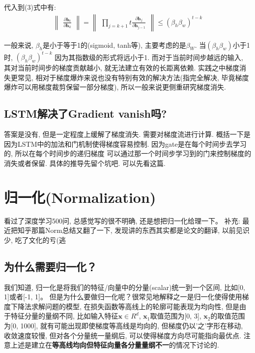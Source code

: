 \documentclass{article}
\begin{document}
代入到(3)式中有:
\begin{align*}
    \begin{Vmatrix}
        \frac{\partial \textbf{h}_t}{\partial \textbf{h}_{k}}
    \end{Vmatrix}
    =
    \begin{Vmatrix}
        \prod_{j=k+1}{t} \frac{\partial \textbf{h}_j}{\partial \textbf{h}_{j-1}}
    \end{Vmatrix}
    \leq (\beta_h \beta_w)^{t-k}
\end{align*}

一般来说, $\beta_h$是小于等于1的(sigmoid, tanh等), 主要考虑的是$\beta_W$. 当$(\beta_h \beta_w)$小于1时,
$(\beta_h \beta_w)^{t-k}$ 因为其指数级的形式将远小于1. 而对于当前时间步越远的输入, 其对当前时间步的梯度贡献越小, 就无法建立有效的长距离依赖.
实践之中梯度消失更常见, 相对于梯度爆炸来说也没有特别有效的解决方法(指完全解决, 毕竟梯度爆炸可以用梯度裁剪保留一部分梯度), 所以一般来说更侧重研究梯度消失.

\subsection{LSTM解决了Gradient vanish吗?}
答案是没有, 但是一定程度上缓解了梯度消失. 需要对梯度流进行计算.
概括一下是因为LSTM中的加法和门机制使得梯度容易控制. 因为gate是在每个时间步去学习的, 所以在每个时间步的递归梯度
可以通过那一个时间步学习到的门来控制梯度的消失或者保留. 具体的推导先留个坑吧. 可以先看这篇.

\section{归一化(Normalization)}

看过了深度学习500问, 总感觉写的很不明确, 还是想把归一化给理一下。
补充: 最近把知乎那篇Norm总结又翻了一下, 发现讲的东西其实都是论文的翻译, 以前见识少,
吃了文化的亏(逃

\subsection{为什么需要归一化？}


我们知道, 归一化是将我们的特征/向量中的分量(scalar)统一到一个区间, 比如[0, 1]或者[-1, 1]。
但是为什么要做归一化呢？很常见地解释之一是归一化使得使用梯度下降法求解问题的模型, 在损失函数等高线上的轮廓可能表现为均向性,
但是由于特征分量的量纲不同, 比如输入特征$\textbf{x} \in R^d$, $\textbf{x}_1$取值范围为[0, 3],
$\textbf{x}_2$的取值范围为[0, 1000], 就有可能出现即使梯度等高线是均向的, 但梯度仍以'之'字形在移动, 收敛速度较慢,
但对各个分量统一量纲后, 可以使得梯度方向尽可能指向最优点. 注意上述是建立在\textbf{等高线均向但特征向量各分量量纲不一}的情况下讨论的.
\end{document}
